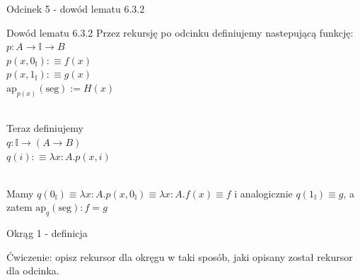 \documentclass{beamer}
\newcommand{\defn}{:\equiv}
\newcommand{\ap}[2]{\text{ap}_{#1}(#2)}
\newcommand{\I}{\mathbb{I}}
\newcommand{\IZ}{0_\mathbb{I}}
\newcommand{\II}{1_\mathbb{I}}
\newcommand{\seg}{\text{seg}}
\begin{document}
\begin{frame}{Odcinek 5 - dowód lematu 6.3.2}
\begin{block}{Dowód lematu 6.3.2}
	Przez rekursję po odcinku definiujemy nastepującą funkcję: \\
	$p : A \to \I \to B$ \\
	$p(x, \IZ) \defn f(x)$ \\
	$p(x, \II) \defn g(x)$ \\
	$\ap{p(x)}{\seg} := H(x)$ \\~\
	
	Teraz definiujemy \\
	$q : \I \to (A \to B)$ \\
	$q(i) \defn \lambda x : A. p(x, i)$ \\~\
	
	Mamy $q(\IZ) \equiv \lambda x : A. p(x, \IZ) \equiv \lambda x : A. f(x) \equiv f$ i analogicznie $q(\II) \equiv g$, a zatem $\ap{q}{\seg} : f = g$
\end{block}
\end{frame}


\begin{frame}{Okrąg 1 - definicja}


Ćwiczenie: opisz rekursor dla okręgu w taki sposób, jaki opisany został rekursor dla odcinka.

\end{frame}
\end{document}
